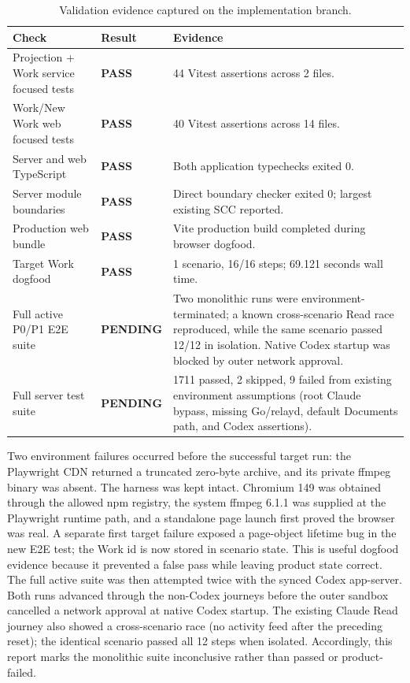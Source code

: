 \documentclass[10pt,a4paper]{article}
\newcommand{\pass}{\textcolor{cradlegreen}{\textbf{PASS}}}
\newcommand{\pending}{\textcolor{cradleamber}{\textbf{PENDING}}}
\begin{document}
\begin{table}[ht]
\centering
\small
\begin{tabularx}{\textwidth}{@{}X l X@{}}
\toprule
Check & Result & Evidence \\
\midrule
Projection + Work service focused tests & \pass & 44 Vitest assertions across 2 files. \\
Work/New Work web focused tests & \pass & 40 Vitest assertions across 14 files. \\
Server and web TypeScript & \pass & Both application typechecks exited 0. \\
Server module boundaries & \pass & Direct boundary checker exited 0; largest existing SCC reported. \\
Production web bundle & \pass & Vite production build completed during browser dogfood. \\
Target Work dogfood & \pass & 1 scenario, 16/16 steps; 69.121 seconds wall time. \\
Full active P0/P1 E2E suite & \pending & Two monolithic runs were environment-terminated; a known cross-scenario Read race reproduced, while the same scenario passed 12/12 in isolation. Native Codex startup was blocked by outer network approval. \\
Full server test suite & \pending & 1711 passed, 2 skipped, 9 failed from existing environment assumptions (root Claude bypass, missing Go/relayd, default Documents path, and Codex assertions). \\
\bottomrule
\end{tabularx}
\caption{Validation evidence captured on the implementation branch.}
\label{tab:results}
\end{table}

Two environment failures occurred before the successful target run: the
Playwright CDN returned a truncated zero-byte archive, and its private ffmpeg
binary was absent.  The harness was kept intact.  Chromium 149 was obtained
through the allowed npm registry, the system ffmpeg 6.1.1 was supplied at the
Playwright runtime path, and a standalone page launch first proved the browser
was real.  A separate first target failure exposed a page-object lifetime bug
in the new E2E test; the Work id is now stored in scenario state.  This is useful
dogfood evidence because it prevented a false pass while leaving product state
correct.  The full active suite was then attempted twice with the synced Codex
app-server.  Both runs advanced through the non-Codex journeys before the outer
sandbox cancelled a network approval at native Codex startup.  The existing
Claude Read journey also showed a cross-scenario race (no activity feed after
the preceding reset); the identical scenario passed all 12 steps when isolated.
Accordingly, this report marks the monolithic suite inconclusive rather than
passed or product-failed.
\end{document}
